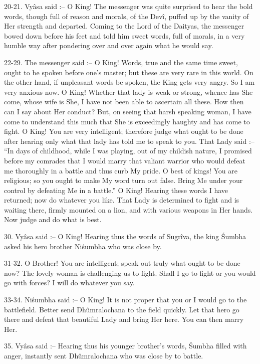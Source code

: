 20-21. Vy\^asa said :-- O King! The messenger was quite surprised to hear the bold words, though full of reason and morals, of the Dev\^i, puffed up by the vanity of Her strength and departed. Coming to the Lord of the Daityas, the messenger bowed down before his feet and told him sweet words, full of morals, in a very humble way after pondering over and over again what he would say.

22-29. The messenger said :-- O King! Words, true and the same time sweet, ought to be spoken before one's master; but these are very rare in this world. On the other hand, if unpleasant words be spoken, the King gets very angry. So I am very anxious now. O King! Whether that lady is weak or strong, whence has She come, whose wife is She, I have not been able to ascertain all these. How then can I say about Her conduct? But, on seeing that harsh speaking woman, I have come to understand this much that She is exceedingly haughty and has come to fight. O King! You are very intelligent; therefore judge what ought to be done after hearing only what that lady has told me to speak to you. That Lady said :-- ``In days of childhood, while I was playing, out of my childish nature, I promised before my comrades that I would marry that valiant warrior who would defeat me thoroughly in a battle and thus curb My pride. O best of kings! You are religious; so you ought to make My word turn out false. Bring Me under your control by defeating Me in a battle.'' O King! Hearing these words I have returned; now do whatever you like. That Lady is determined to fight and is waiting there, firmly mounted on a lion, and with various weapons in Her hands. Now judge and do what is best.

30. Vy\^asa said :-- O King! Hearing thus the words of Sugr\^iva, the king \'Sumbha asked his hero brother Ni\'sumbha who was close by.

31-32. O Brother! You are intelligent; speak out truly what ought to be done now? The lovely woman is challenging us to fight. Shall I go to fight or you would go with forces? I will do whatever you say.

33-34. Ni\'sumbha said :-- O King! It is not proper that you or I would go to the battlefield. Better send Dh\^umralochana to the field quickly. Let that hero go there and defeat that beautiful Lady and bring Her here. You can then marry Her.

35. Vy\^asa said :-- Hearing thus his younger brother's words, \'Sumbha filled with anger, instantly sent Dh\^umralochana who was close by to battle.

